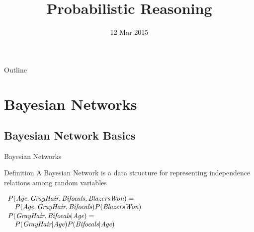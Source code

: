 \documentclass[14pt]{beamer}
\title{Probabilistic Reasoning}
\date{12 Mar 2015}
\begin{document}
\begin{frame}
\titlepage
\end{frame}

\begin{frame}{Outline}
\tableofcontents
\end{frame}

\section{Bayesian Networks}

\subsection{Bayesian Network Basics}

\begin{frame}[label=bayes-net-definition]{Bayesian Networks}
\begin{block}{Definition}
A \alert{Bayesian Network} is a data structure for representing independence relations among random variables
\end{block}
\begin{center}
\end{center}
\pause
$
\begin{array}{ll}
\lefteqn{P(\textit{Age}, \textit{GrayHair}, \textit{Bifocals}, \textit{BlazersWon}) = \mbox{}}\\ 
& P(\textit{Age}, \textit{GrayHair}, \textit{Bifocals})P(\textit{BlazersWon})
\end{array}
$
\pause
\smallskip
$
\begin{array}{ll}
\lefteqn{P(\textit{GrayHair},\textit{Bifocals}|\textit{Age}) = \mbox{}}\\ 
& P(\textit{GrayHair}|\textit{Age})P(\textit{Bifocals}|\textit{Age})
\end{array}
$ \\
\end{frame}
\end{document}

